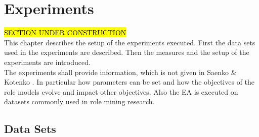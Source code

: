 \newpage
\chapter{Experiments}
\label{sec:experiments}
\hl{SECTION UNDER CONSTRUCTION}\\
This chapter describes the setup of the experiments executed. First the data sets used in the experiments are described. Then the measures and the setup of the experiments are introduced.\\
The experiments shall provide information, which is not given in Saenko \& Kotenko \cite{saenko2012design}. In particular how parameters can be set and how the objectives of the role models evolve and impact other objectives. Also the EA is executed on datasets commonly used in role mining research.

\section{Data Sets}
